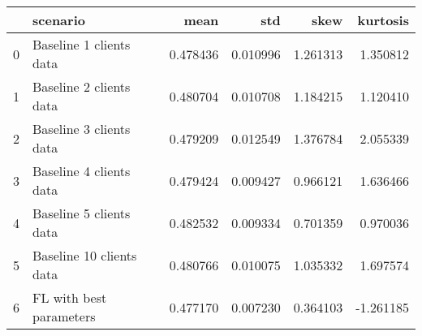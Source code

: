 \begin{tabular}{llrrrr}
\toprule
{} &                  scenario &      mean &       std &      skew &  kurtosis \\
\midrule
0 &   Baseline 1 clients data &  0.478436 &  0.010996 &  1.261313 &  1.350812 \\
1 &   Baseline 2 clients data &  0.480704 &  0.010708 &  1.184215 &  1.120410 \\
2 &   Baseline 3 clients data &  0.479209 &  0.012549 &  1.376784 &  2.055339 \\
3 &   Baseline 4 clients data &  0.479424 &  0.009427 &  0.966121 &  1.636466 \\
4 &   Baseline 5 clients data &  0.482532 &  0.009334 &  0.701359 &  0.970036 \\
5 &  Baseline 10 clients data &  0.480766 &  0.010075 &  1.035332 &  1.697574 \\
6 &   FL with best parameters &  0.477170 &  0.007230 &  0.364103 & -1.261185 \\
\bottomrule
\end{tabular}
